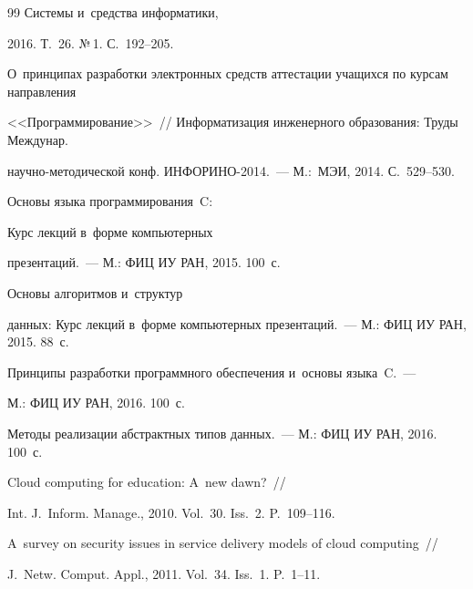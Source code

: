 {{\begin{thebibliography}{99}
Системы и~средства информатики,


2016. Т.~26. №\,1. С.~192--205.









О~принципах разработки электронных средств аттестации учащихся по курсам направления 


<<Программирование>>~/\!\!/ Информатизация инженерного образования: Труды Междунар.


научно-методической конф. ИНФОРИНО-2014.~--- М.:~МЭИ, 2014. С.~529--530.







 Основы языка программирования~C: 


Курс лекций в~форме компьютерных


презентаций.~--- М.: ФИЦ ИУ РАН, 2015. 100~с.







 Основы алгоритмов и~структур 


данных: Курс лекций в~форме компьютерных презентаций.~--- М.: ФИЦ ИУ РАН, 2015. 88~с.









Принципы разработки программного обеспечения и~основы языка~C.~--- 


М.: ФИЦ ИУ РАН, 2016. 100~с.









Методы реализации абстрактных типов данных.~--- М.: ФИЦ ИУ РАН, 2016. 100~с.







 Cloud computing for education: A~new dawn?~/\!\!/ 


Int. J.~Inform. Manage., 2010. Vol.~30. Iss.~2. P.~109--116.









A~survey on security issues in service delivery models of cloud computing~/\!\!/ 


J.~Netw. Comput. Appl., 2011. Vol.~34. Iss.~1. P.~1--11.





       \end{thebibliography}


} }
